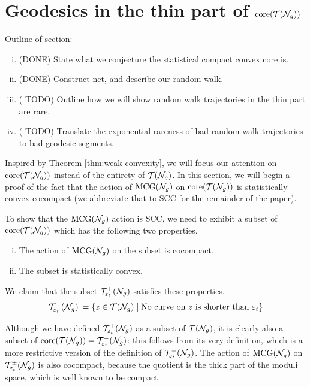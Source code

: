 \documentclass[12pt, reqno]{amsart}
\begin{document}
\section{Geodesics in the thin part of $\mathrm{core}(\mathcal{T}(\mathcal{N}_g))$}
\label{sec:recurr-rand-walks}

Outline of section:
\begin{enumerate}[(i)]
\item (DONE) State what we conjecture the statistical compact convex core is.
\item (DONE) Construct net, and describe our random walk.
\item ({\color{red} TODO}) Outline how we will show random walk trajectories in the thin part are rare.
\item ({\color{red} TODO}) Translate the exponential rareness of bad random walk trajectories to bad geodesic segments.
\end{enumerate}

Inspired by Theorem \ref{thm:weak-convexity}, we will focus our attention on $\mathrm{core}(\mathcal{T}(\mathcal{N}_g))$ instead of the entirety of $\mathcal{T}(\mathcal{N}_g)$.
In this section, we will begin a proof of the fact that the action of $\mathrm{MCG}(\mathcal{N}_g)$ on $\mathrm{core}(\mathcal{T}(\mathcal{N}_g))$ is statistically convex cocompact (we abbreviate that to SCC for the remainder of the paper).

To show that the $\mathrm{MCG}(\mathcal{N}_g)$ action is SCC, we need to exhibit a subset of $\mathrm{core}(\mathcal{T}(\mathcal{N}_g))$ which has the following two properties.
\begin{enumerate}[(i)]
\item The action of $\mathrm{MCG}(\mathcal{N}_g)$ on the subset is cocompact.
\item The subset is statistically convex.
\end{enumerate}
We claim that the subset $\mathcal{T}_{\varepsilon_t}^{\pm}(\mathcal{N}_g)$ satisfies these properties.
\begin{align*}
  \mathcal{T}_{\varepsilon_t}^{\pm}(\mathcal{N}_g) \coloneqq \left\{ z \in \mathcal{T}(\mathcal{N}_g) \mid \text{No curve on $z$ is shorter than $\varepsilon_t$} \right\}
\end{align*}

Although we have defined $\mathcal{T}_{\varepsilon_t}^{\pm}(\mathcal{N}_g)$ as a subset of $\mathcal{T}(\mathcal{N}_g)$, it is clearly also a subset of $\mathrm{core}(\mathcal{T}(\mathcal{N}_g)) = \mathcal{T}_{\varepsilon_t}^{-}(\mathcal{N}_g)$: this follows from its very definition, which is a more restrictive version of the definition of $\mathcal{T}_{\varepsilon_t}^{-}(\mathcal{N}_g)$.
The action of $\mathrm{MCG}(\mathcal{N}_g)$ on $\mathcal{T}_{\varepsilon_t}^{\pm}(\mathcal{N}_g)$ is also cocompact, because the quotient is the thick part of the moduli space, which is well known to be compact.
\end{document}
